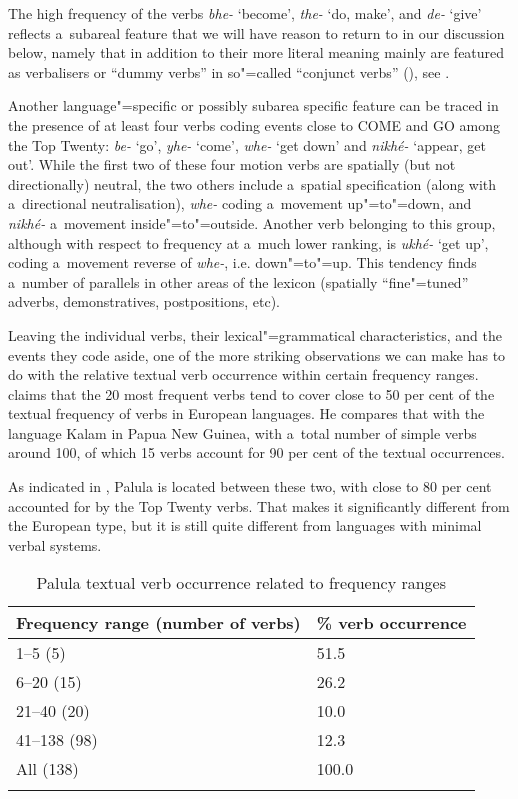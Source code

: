 The high frequency of the verbs \textit{bhe-} `become', \textit{the-} `do, make', and \textit{de-} `give' reflects a~subareal feature that we will have reason to return to in our discussion below, namely that in addition to their more literal meaning mainly are featured as verbalisers \citep[368]{masica1991} or ``dummy verbs'' in so"=called ``conjunct verbs'' (\citeyear[326]{masica1991}), see . 



Another language"=specific or possibly subarea specific feature can be traced in the presence of at least four verbs coding events close to COME and GO among the Top Twenty: \textit{be-} `go', \textit{yhe-} `come', \textit{whe-} `get down' and \textit{nikhé-} `appear, get out'. While the first two of these four motion verbs are spatially (but not directionally) neutral, the two others include a~spatial specification (along with a~directional neutralisation), \textit{whe-} coding a~movement up"=to"=down, and \textit{nikhé-} a~movement inside"=to"=outside. Another verb belonging to this group, although with respect to frequency at a~much lower ranking, is \textit{ukhé-} `get up', coding a~movement reverse of \textit{whe-}, i.e. down"=to"=up. This tendency finds a~number of parallels in other areas of the lexicon (spatially ``fine"=tuned'' adverbs, demonstratives, postpositions, etc).



Leaving the individual verbs, their lexical"=grammatical characteristics, and the events they code aside, one of the more striking observations we can make has to do with the relative textual verb occurrence within certain frequency ranges. \citet[409]{viberg2006} claims that the 20 most frequent verbs tend to cover close to 50 per cent of the textual frequency of verbs in European languages. He compares that with the language Kalam in Papua New Guinea, with a~total number of simple verbs around 100, of which 15 verbs account for 90 per cent of the textual occurrences. 



As indicated in , Palula is located between these two, with close to 80 per cent accounted for by the Top Twenty verbs. That makes it significantly different from the European type, but it is still quite different from languages with minimal verbal systems. 


\begin{table}[ht]
\caption{Palula textual verb occurrence related to frequency ranges}

\begin{tabularx}{\textwidth}{ Q P{50mm} }
\lsptoprule
Frequency range (number of verbs) &
\%  verb occurrence\\--5 (5) &
\phantom{1}51.5\\
6--20 (15) &
\phantom{1}26.2\\
21--40 (20) &
\phantom{1}10.0\\
41--138 (98) &
\phantom{1}12.3\\
All (138) &
100.0\\\lspbottomrule
\end{tabularx}
\label{tab:8-2}
\end{table}


